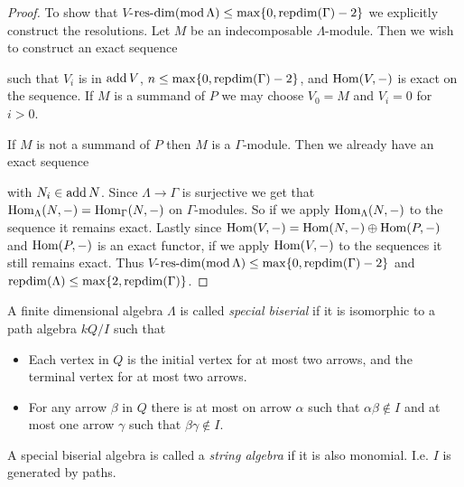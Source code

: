 \begin{theorem}
\begin{proof}
		To show that $V$-$\operatorname{res-dim}(\operatorname{mod} \Lambda) \leq \max\{0, \operatorname{repdim}(\Gamma)-2\}$ we explicitly construct the resolutions. Let $M$ be an indecomposable $\Lambda$-module. Then we wish to construct an exact sequence
		\begin{center}
		\end{center} 
		such that $V_i$ is in $\operatorname{add} V$, $n\leq \max\{0, \operatorname{repdim}(\Gamma)-2\}$, and $\operatorname{Hom}(V, -)$ is exact on the sequence. If $M$ is a summand of $P$ we may choose $V_0=M$ and $V_i=0$ for $i>0$.
		
		If $M$ is not a summand of $P$ then $M$ is a $\Gamma$-module. Then we already have an exact sequence
		\begin{center}
		\end{center} 
		with $N_i \in \operatorname{add} N$. Since $\Lambda \to \Gamma$ is surjective we get that $\operatorname{Hom}_\Lambda(N, -)=\operatorname{Hom}_\Gamma(N,-)$ on $\Gamma$-modules. So if we apply $\operatorname{Hom}_\Lambda(N, -)$ to the sequence it remains exact. Lastly since $\operatorname{Hom}(V,-) = \operatorname{Hom}(N, -) \oplus \operatorname{Hom}(P, -)$ and $\operatorname{Hom}(P, -)$ is an exact functor, if we apply $\operatorname{Hom}(V, -)$ to the sequences it still remains exact. Thus $V$-$\operatorname{res-dim}(\operatorname{mod} \Lambda) \leq \max\{0, \operatorname{repdim}(\Gamma)-2\}$ and $\operatorname{repdim}(\Lambda) \leq \max\{2, \operatorname{repdim}(\Gamma)\}$. 
	\end{proof}
\end{theorem}

\begin{defn}
	A finite dimensional algebra $\Lambda$ is called \emph{special biserial} if it is isomorphic to a path algebra $kQ/I$ such that
	\begin{itemize}
		\item Each vertex in $Q$ is the initial vertex for at most two arrows, and the terminal vertex for at most two arrows.
		\item For any arrow $\beta$ in $Q$ there is at most on arrow $\alpha$ such that $\alpha\beta \not\in I$ and at most one arrow $\gamma$ such that $\beta\gamma \not\in I$.
	\end{itemize}
	A special biserial algebra is called a \emph{string algebra} if it is also monomial. I.e. $I$ is generated by paths. 
\end{defn}

